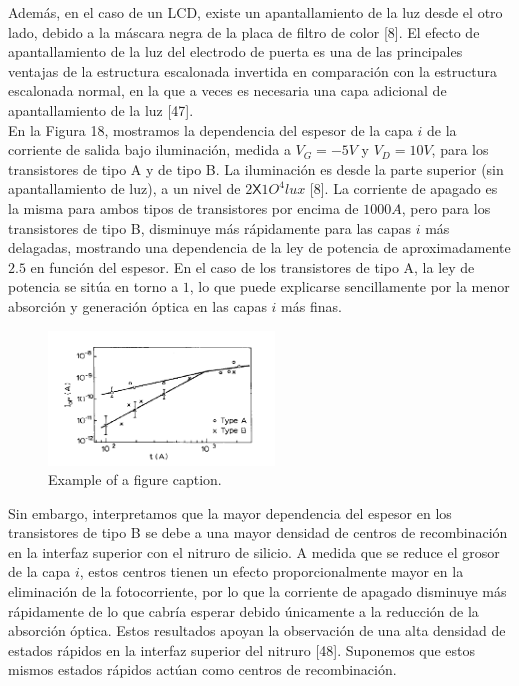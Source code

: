 \documentclass[conference]{IEEEtran}
\begin{document}
    Además, en el caso de un LCD, existe un apantallamiento de la luz desde el otro lado, debido a 
    la máscara negra de la placa de filtro de color [8]. El efecto de apantallamiento de la luz del 
    electrodo de puerta es una de las principales ventajas de la estructura escalonada invertida en 
    comparación con la estructura escalonada normal, en la que a veces es necesaria una capa 
    adicional de apantallamiento de la luz [47].
    \\
    En la Figura 18, mostramos la dependencia del espesor de la capa $i$ de la corriente de salida 
    bajo iluminación, medida a $V_G=- 5 V$ y $V_D= 10 V$, para los transistores de tipo A y de tipo B.
    La iluminación es desde la parte superior (sin apantallamiento de luz), a un nivel de 
    $2 \mathsf{X} 1O^4 lux$ [8]. La corriente de apagado es la misma para ambos tipos de transistores por
    encima de $1000 A$, pero para los transistores de tipo B, disminuye más rápidamente para las 
    capas $i$ más delagadas, mostrando una dependencia de la ley de potencia de 
    aproximadamente $2.5$ en función del espesor. En el caso de los transistores de tipo A, 
    la ley de potencia se sitúa en torno a $1$, lo que puede explicarse sencillamente por la 
    menor absorción y generación óptica en las capas $i$ más finas. 
   
\begin{figure}[htbp]
    \centerline{\includegraphics[width=6.0cm]{img/imagen-18.png}}
    \caption{Example of a figure caption.}%
    \label{fig18}
\end{figure}  
 
    Sin embargo, interpretamos 
    que la mayor dependencia del espesor en los transistores de tipo B se debe a una mayor densidad 
    de centros de recombinación en la interfaz superior con el nitruro de silicio. A medida que 
    se reduce el grosor de la capa $i$, estos centros tienen un efecto proporcionalmente mayor 
    en la eliminación de la fotocorriente, por lo que la corriente de apagado disminuye más 
    rápidamente de lo que cabría esperar debido únicamente a la reducción de la absorción óptica. 
    Estos resultados apoyan la observación de una alta densidad de estados rápidos en la interfaz 
    superior del nitruro [48]. Suponemos que estos mismos estados rápidos actúan como centros de 
    recombinación.
    
\end{document}

